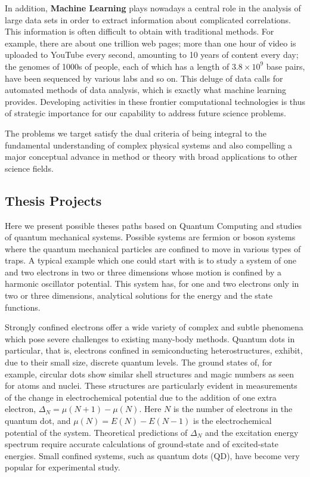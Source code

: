 \documentclass[%
oneside,                 %
final,                   %
10pt]{article}
\begin{document}
In addition, \textbf{Machine Learning} plays nowadays a central role in the analysis of large data sets in order to extract information about complicated correlations. This information is often difficult to obtain with traditional methods. For example, there are about one trillion web pages; more than one
hour of video is uploaded to YouTube every second, amounting to 10 years of content every
day; the genomes of 1000s of people, each of which has a length of $3.8\times 10^9$ base pairs, have
been sequenced by various labs and so on. This deluge of data calls for automated methods of data analysis,
which is exactly what machine
learning provides.  Developing activities in these frontier computational technologies is thus of strategic importance for  our capability to address future science problems.

The problems we target satisfy the dual criteria of being
integral to the fundamental understanding of complex physical systems  and also compelling a major
conceptual advance in method or theory with broad applications to other science fields. 



\subsection*{Thesis Projects}

Here we present possible theses paths based on Quantum Computing  and
studies of quantum mechanical systems.  Possible systems are fermion
or boson systems where the quantum mechanical particles are confined
to move in various types of traps. A typical example which one could
start with is to study a system of one and two electrons in two or three
dimensions whose motion is confined by a harmonic  oscillator potential. This
system has, for one and two electrons only in two or three dimensions,
analytical solutions for the energy and the state
functions. 


Strongly confined electrons offer a wide variety of complex and subtle
phenomena which pose severe challenges to existing many-body methods.
Quantum dots in particular, that is, electrons confined in
semiconducting heterostructures, exhibit, due to their small size,
discrete quantum levels.  The ground states of, for example, circular
dots show similar shell structures and magic numbers as seen for atoms
and nuclei. These structures are particularly evident in measurements
of the change in electrochemical potential due to the addition of one
extra electron, $\Delta_N=\mu(N+1)-\mu(N)$. Here $N$ is the number of
electrons in the quantum dot, and $\mu(N)=E(N)-E(N-1)$ is the
electrochemical potential of the system.  Theoretical predictions of
$\Delta_N$ and the excitation energy spectrum require accurate
calculations of ground-state and of excited-state energies.  Small
confined systems, such as quantum dots (QD), have become very popular
for experimental study. 
\end{document}
